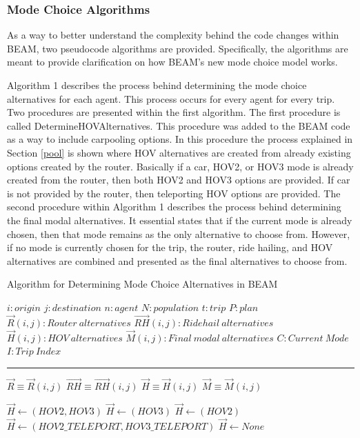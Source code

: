 \documentclass[3p, authoryear, review]{elsarticle} %
\begin{document}
\hypertarget{algo}{%
\subsubsection{Mode Choice Algorithms}\label{algo}}

As a way to better understand the complexity behind the code changes within BEAM, two pseudocode algorithms are provided. Specifically, the algorithms are meant to provide clarification on how BEAM's new mode choice model works.

Algorithm 1 describes the process behind determining the mode choice alternatives for each agent. This process occurs for every agent for every trip. Two procedures are presented within the first algorithm. The first procedure is called DetermineHOVAlternatives. This procedure was added to the BEAM code as a way to include carpooling options. In this procedure the process explained in Section \ref{pool} is shown where HOV alternatives are created from already existing options created by the router. Basically if a car, HOV2, or HOV3 mode is already created from the router, then both HOV2 and HOV3 options are provided. If car is not provided by the router, then teleporting HOV options are provided. The second procedure within Algorithm 1 describes the process behind determining the final modal alternatives. It essential states that if the current mode is already chosen, then that mode remains as the only alternative to choose from. However, if no mode is currently chosen for the trip, the router, ride hailing, and HOV alternatives are combined and presented as the final alternatives to choose from.

\begin{algorithm} [tph]
\caption{Algorithm for Determining Mode Choice Alternatives in BEAM}
\begin{algorithmic}[1]
\Require
\State $i : origin$
\State $j : destination$
\State $n: agent$
\State $N: population$
\State $t : trip $
\State $P : plan$
\State $\vec{R}(i,j) : Router\: alternatives$
\State $\vec{RH}(i,j) : Ridehail\:alternatives$
\State $\vec{H}(i,j) : HOV\:alternatives$
\State $\vec{M}(i,j) : Final\:modal\:alternatives$
\State $C : Current\:Mode$
\State $I : Trip\:Index$
\vspace{4pt}\hrule\vspace{5pt}

\State $\vec{R} \equiv \vec{R}(i,j)$
\State $\vec{RH} \equiv \vec{RH}(i,j)$
\State $\vec{H} \equiv \vec{H}(i,j)$
\State $\vec{M} \equiv \vec{M}(i,j)$

    \State $\vec{H} \gets (HOV2,HOV3)$
    \State $\vec{H} \gets (HOV3)$
    \State $\vec{H} \gets (HOV2)$
    \State $\vec{H} \gets (HOV2\_TELEPORT, HOV3\_TELEPORT)$
  \EndIf
\Else
  \State $\vec{H} \gets None$
\EndIf
\EndProcedure
\Statex
{}
\end{algorithmic}
\end{algorithm}
\end{document}
